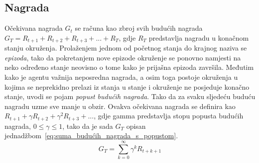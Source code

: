 \subsection{Nagrada}
Očekivana nagrada $G_t$ se računa kao zbroj svih budućih nagrada $G_T = R_{t+1}+R_{t+2}+R_{t+3}+ ... + R_T$, gdje $R_T$ predstavlja nagradu u konačnom stanju okruženja. Prolaženjem jednom od početnog stanja do krajnog naziva se \emph{epizoda}, tako da pokretanjem nove epizode okruženje se ponovno namjesti na neko određeno stanje neovisno o tome kako je prijašna epizoda završila. Međutim kako je agentu važnija neposredna nagrada, a osim toga postoje okruženja u kojima se neprekidno prelazi iz stanja u stanje i okruženje ne posjeduje konačno stanje, uvodi se pojam \emph{popust budućih nagrada}. Tako da za svaku sljedeću buduću nagradu uzme sve manje u obzir. Ovakva očekivana nagrada se definira kao $R_{t+1} + \gamma R_{t+2} + \gamma ^2 R_{t+3}+...$, gdje gamma predstavlja stopu popusta budućih nagrada, $0 \leq \gamma \leq 1$, tako da je sada $G_T$ opisan jednadžbom~\ref{eq:suma_budućih_nagrada_s_popustom}.
\begin{equation}\label{eq:suma_budućih_nagrada_s_popustom}
	G_T = \sum_{k=0}^{\infty} \gamma^k R_{t+k+1}
\end{equation}

